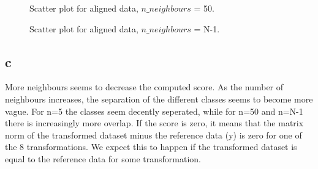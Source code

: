\documentclass[a4paper,12pt]{article}
\begin{document}
\begin{figure}[H]
\hfill
{}
\hfill
\caption{Scatter plot for aligned data, $n\_neighbours$ = 50.}
\label{52}
\end{figure}

\begin{figure}[H]
\hfill
{}
\hfill
\caption{Scatter plot for aligned data, $n\_neighbours$ = N-1. }
\label{53}
\end{figure}
\subsection{c}
More neighbours seems to decrease the computed score. As the number of neighbours increases, the separation of the different classes seems to become more vague. For n=5 the classes seem decently seperated, while for n=50 and n=N-1 there is increasingly more overlap. If the score is zero, it means that the matrix norm of the transformed dataset minus the reference data (y) is zero for one of the 8 transformations. We expect this to happen if the transformed dataset is equal to the reference data for some transformation.
\end{document}
